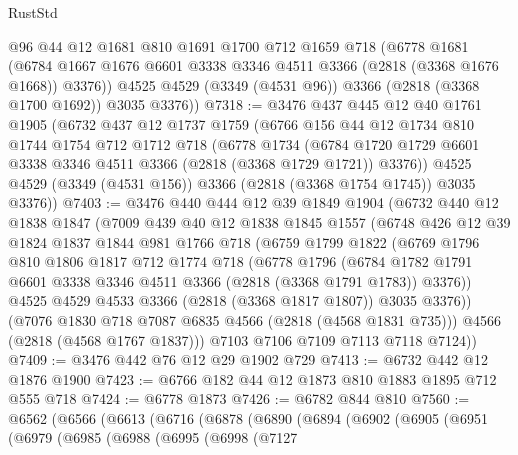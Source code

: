 \begin{lexlean}{RustStd}
\begin{coremodule}
        @96
        @44
        @12
        @1681
        @810
        @1691
        @1700
        @712
        @1659
        @718
        (@6778
          @1681
          (@6784 @1667 @1676 @6601 @3338 @3346 @4511 @3366 (@2818 (@3368 @1676 @1668)) @3376))
        @4525
        @4529
        (@3349 (@4531 @96))
        @3366
        (@2818 (@3368 @1700 @1692))
        @3035
        @3376))
@7318 := @3476
    @437
    @445
    @12
    @40
    @1761
    @1905
    (@6732
      @437
      @12
      @1737
      @1759
      (@6766
        @156
        @44
        @12
        @1734
        @810
        @1744
        @1754
        @712
        @1712
        @718
        (@6778
          @1734
          (@6784 @1720 @1729 @6601 @3338 @3346 @4511 @3366 (@2818 (@3368 @1729 @1721)) @3376))
        @4525
        @4529
        (@3349 (@4531 @156))
        @3366
        (@2818 (@3368 @1754 @1745))
        @3035
        @3376))
@7403 := @3476
    @440
    @444
    @12
    @39
    @1849
    @1904
    (@6732
      @440
      @12
      @1838
      @1847
      (@7009
        @439
        @40
        @12
        @1838
        @1845
        @1557
        (@6748
          @426
          @12
          @39
          @1824
          @1837
          @1844
          @981
          @1766
          @718
          (@6759
            @1799
            @1822
            (@6769
              @1796
              @810
              @1806
              @1817
              @712
              @1774
              @718
              (@6778
                @1796
                (@6784 @1782 @1791 @6601 @3338 @3346 @4511 @3366 (@2818 (@3368 @1791 @1783)) @3376))
              @4525
              @4529
              @4533
              @3366
              (@2818 (@3368 @1817 @1807))
              @3035
              @3376))
          (@7076 @1830 @718 @7087 @6835 @4566 (@2818 (@4568 @1831 @735)))
          @4566
          (@2818 (@4568 @1767 @1837)))
        @7103
        @7106
        @7109
        @7113
        @7118
        @7124))
@7409 := @3476 @442 @76 @12 @29 @1902 @729
@7413 := @6732 @442 @12 @1876 @1900
@7423 := @6766 @182 @44 @12 @1873 @810 @1883 @1895 @712 @555 @718
@7424 := @6778 @1873
@7426 := @6782 @844 @810
@7560 := @6562
    (@6566
      (@6613
        (@6716
          (@6878
            (@6890
              (@6894
                (@6902
                  (@6905
                    (@6951
                      (@6979
                        (@6985
                          (@6988
                            (@6995
                              (@6998
                                (@7127

\end{coremodule}
\end{lexlean}
